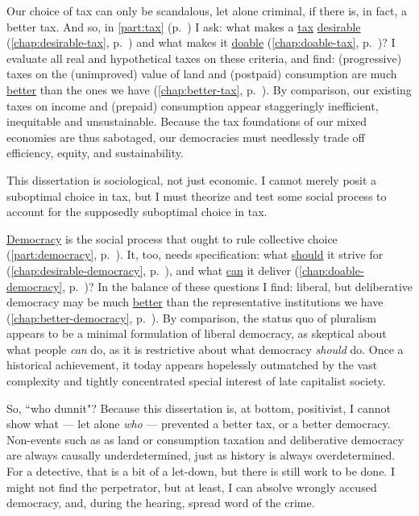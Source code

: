 Our choice of tax can only be scandalous, let alone criminal, if there is, in fact, a better tax.
And so, in \autoref{part:tax} (p.~\pageref{part:tax}) I ask:
what makes a \hyperref[part:tax]{tax} \hyperref[chap:desirable-tax]{desirable} (\autoref{chap:desirable-tax}, p.~\pageref{chap:desirable-tax}) and what makes it \hyperref[chap:doable-tax]{doable} (\autoref{chap:doable-tax}, p.~\pageref{chap:doable-tax})?
I evaluate all real and hypothetical taxes on these criteria, and find:
(progressive) taxes on the (unimproved) value of land and (postpaid) consumption are much \hyperref[chap:better-tax]{better} than the ones we have (\autoref{chap:better-tax}, p.~\pageref{chap:better-tax}).
By comparison, our existing taxes on income and (prepaid) consumption appear staggeringly inefficient, inequitable and unsustainable.
Because the tax foundations of our mixed economies are thus sabotaged, our democracies must needlessly trade off efficiency, equity, and sustainability.

This dissertation is sociological, not just economic.
I cannot merely posit a suboptimal choice in tax, but I must theorize and test some social process to account for the supposedly suboptimal choice in tax.

\hyperref[part:democracy]{Democracy} is the social process that ought to rule collective choice (\autoref{part:democracy}, p.~\pageref{part:democracy}).
It, too, needs specification:
what \hyperref[chap:desirable-democracy]{should} it strive for (\autoref{chap:desirable-democracy}, p.~\pageref{chap:desirable-democracy}), and what \hyperref[chap:doable-democracy]{can} it deliver (\autoref{chap:doable-democracy}, p.~\pageref{chap:doable-democracy})?
In the balance of these questions I find:
liberal, but deliberative democracy may be much \hyperref[chap:better-democracy]{better} than the representative institutions we have (\autoref{chap:better-democracy}, p.~\pageref{chap:better-democracy}).
By comparison, the status quo of pluralism appears to be a minimal formulation of liberal democracy, as skeptical about what people \emph{can} do, as it is restrictive about what democracy \emph{should} do.
Once a historical achievement, it today appears hopelessly outmatched by the vast complexity and tightly concentrated special interest of late capitalist society.

So, ``who dunnit"?
Because this dissertation is, at bottom, positivist, I cannot show what --- let alone \emph{who} --- prevented a better tax, or a better democracy.
Non-events such as as land or consumption taxation and deliberative democracy are always causally underdetermined, just as history is always overdetermined.
For a detective, that is a bit of a let-down, but there is still work to be done.
I might not find the perpetrator, but at least, I can absolve wrongly accused democracy, and, during the hearing, spread word of the crime.

